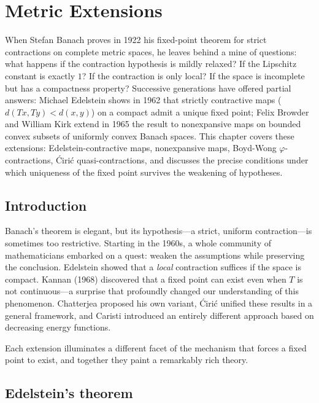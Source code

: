 \chapter{Metric Extensions}\label{ch:extensions}

When Stefan Banach proves in 1922 his fixed-point theorem for strict contractions on complete metric spaces, he leaves behind a mine of questions: what happens if the contraction hypothesis is mildly relaxed? If the Lipschitz constant is exactly $1$? If the contraction is only local? If the space is incomplete but has a compactness property? Successive generations have offered partial answers: Michael Edelstein shows in 1962 that strictly contractive maps ($d(Tx,Ty) < d(x,y)$) on a compact admit a unique fixed point; Felix Browder and William Kirk extend in 1965 the result to nonexpansive maps on bounded convex subsets of uniformly convex Banach spaces. This chapter covers these extensions: Edelstein-contractive maps, nonexpansive maps, Boyd-Wong $\varphi$-contractions, Ćirić quasi-contractions, and discusses the precise conditions under which uniqueness of the fixed point survives the weakening of hypotheses.

\section{Introduction}

Banach's theorem is elegant, but its hypothesis---a strict, uniform contraction---is sometimes too restrictive. Starting in the 1960s, a whole community of mathematicians embarked on a quest: weaken the assumptions while preserving the conclusion. Edelstein showed that a \emph{local} contraction suffices if the space is compact. Kannan (1968) discovered that a fixed point can exist even when $T$ is not continuous---a surprise that profoundly changed our understanding of this phenomenon. Chatterjea proposed his own variant, \'Ciri\'c unified these results in a general framework, and Caristi introduced an entirely different approach based on decreasing energy functions.

Each extension illuminates a different facet of the mechanism that forces a fixed point to exist, and together they paint a remarkably rich theory.

\section{Edelstein's theorem}

